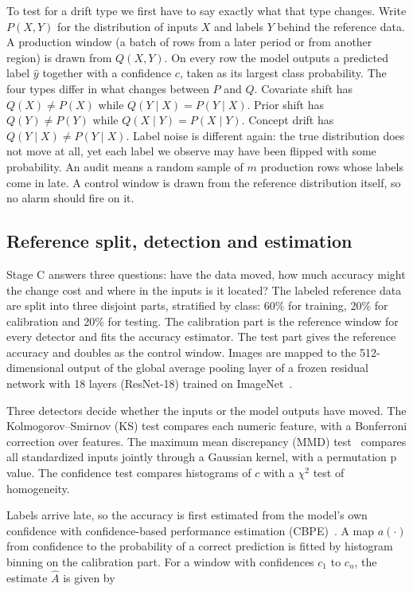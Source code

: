 \documentclass[pdflatex,sn-mathphys-num]{sn-jnl}
\begin{document}
To test for a drift type we first have to say exactly what that type changes. Write $P(X,Y)$ for the distribution of inputs $X$ and labels $Y$ behind the reference data. A production window (a batch of rows from a later period or from another region) is drawn from $Q(X,Y)$. On every row the model outputs a predicted label $\hat y$ together with a confidence $c$, taken as its largest class probability. The four types differ in what changes between $P$ and $Q$. Covariate shift has $Q(X)\neq P(X)$ while $Q(Y\mid X)=P(Y\mid X)$. Prior shift has $Q(Y)\neq P(Y)$ while $Q(X\mid Y)=P(X\mid Y)$. Concept drift has $Q(Y\mid X)\neq P(Y\mid X)$. Label noise is different again: the true distribution does not move at all, yet each label we observe may have been flipped with some probability. An audit means a random sample of $m$ production rows whose labels come in late. A control window is drawn from the reference distribution itself, so no alarm should fire on it.

\subsection{Reference split, detection and estimation}\label{sec:detection}

Stage C answers three questions: have the data moved, how much accuracy might the change cost and where in the inputs is it located? The labeled reference data are split into three disjoint parts, stratified by class: 60\% for training, 20\% for calibration and 20\% for testing. The calibration part is the reference window for every detector and fits the accuracy estimator. The test part gives the reference accuracy and doubles as the control window. Images are mapped to the 512-dimensional output of the global average pooling layer of a frozen residual network with 18 layers (ResNet-18) trained on ImageNet~\cite{he2016deep}.

Three detectors decide whether the inputs or the model outputs have moved. The Kolmogorov--Smirnov (KS) test compares each numeric feature, with a Bonferroni correction over features. The maximum mean discrepancy (MMD) test~\cite{gretton2012kernel} compares all standardized inputs jointly through a Gaussian kernel, with a permutation p value. The confidence test compares histograms of $c$ with a $\chi^2$ test of homogeneity.

Labels arrive late, so the accuracy is first estimated from the model's own confidence with confidence-based performance estimation (CBPE)~\cite{kivimaki2025performance}. A map $a(\cdot)$ from confidence to the probability of a correct prediction is fitted by histogram binning on the calibration part. For a window with confidences $c_1$ to $c_n$, the estimate $\hat A$ is given by
\end{document}
